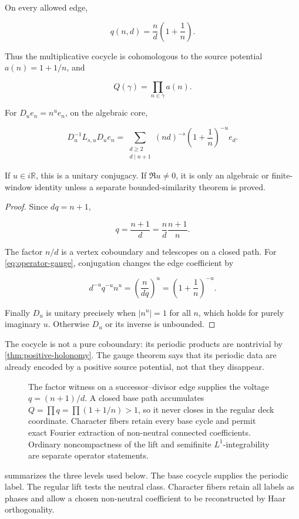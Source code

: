 \begin{theorem}
\label{thm:gauge}
On every allowed edge,

\begin{equation}
 q(n,d)=\frac nd\left(1+\frac1n\right).
\label{eq:gauge}
\end{equation}

Thus the multiplicative cocycle is cohomologous to the source potential
\(a(n)=1+1/n\), and

\[
 Q(\gamma)=\prod_{n\in\gamma}a(n).
\]

For \(D_ue_n=n^ue_n\), on the algebraic core,

\begin{equation}
 D_u^{-1}L_{s,u}D_u e_n=
 \sum_{\substack{d\ge2\\d\mid n+1}}
 (nd)^{-s}\left(1+\frac1n\right)^{-u}e_d.
\label{eq:operator-gauge}
\end{equation}

If \(u\in i\mathbb R\), this is a unitary conjugacy.  If
\(\Re u\ne0\), it is only an algebraic or finite-window identity unless a
separate bounded-similarity theorem is proved.
\end{theorem}

\begin{proof}
Since \(dq=n+1\),

\[
 q=\frac{n+1}{d}=\frac nd\frac{n+1}{n}.
\]

The factor \(n/d\) is a vertex coboundary and telescopes on a closed path.
For \cref{eq:operator-gauge}, conjugation changes the edge coefficient by

\[
 d^{-u}q^{-u}n^u
 =\left(\frac n{dq}\right)^u
 =\left(1+\frac1n\right)^{-u}.
\]

Finally \(D_u\) is unitary precisely when \(|n^u|=1\) for all \(n\), which
holds for purely imaginary \(u\).  Otherwise \(D_u\) or its inverse is
unbounded.
\end{proof}

The cocycle is not a pure coboundary: its periodic products are nontrivial by
\cref{thm:positive-holonomy}.  The gauge theorem says that its periodic data
are already encoded by a positive source potential, not that they disappear.

\begin{figure}[t]
\centering

\caption{The factor witness on a successor--divisor edge supplies the voltage
\(q=(n+1)/d\).  A closed base path accumulates
\(Q=\prod q=\prod(1+1/n)>1\), so it never closes in the regular deck
coordinate.  Character fibers retain every base cycle and permit exact
Fourier extraction of non-neutral connected coefficients.  Ordinary
noncompactness of the lift and semifinite \(L^1\)-integrability are separate
operator statements.}
\label{fig:extension-anatomy}
\end{figure}

 summarizes the three levels used below.  The
base cocycle supplies the periodic label.  The regular lift tests the neutral
class.  Character fibers retain all labels as phases and allow a chosen
non-neutral coefficient to be reconstructed by Haar orthogonality.
